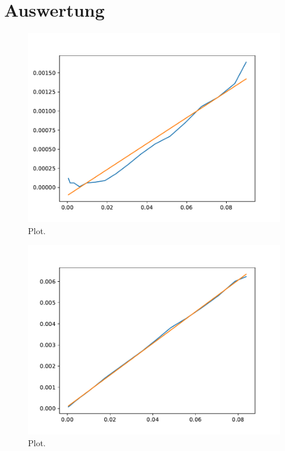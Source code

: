 \section{Auswertung}
\label{sec:Auswertung}





\begin{figure}
  \centering
  \includegraphics{../plots/Stange1.pdf}
  \caption{Plot.}
  \label{fig:plot}
\end{figure}





\begin{figure}
  \centering
  \includegraphics{../plots/Stange2.pdf}
  \caption{Plot.}
  \label{fig:plot}
\end{figure}

